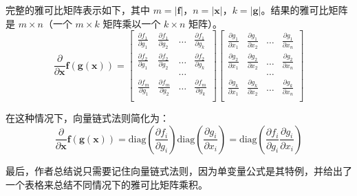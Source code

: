\documentclass[11pt]{article}
\begin{document}
完整的雅可比矩阵表示如下，其中 \(m=|\mathbf{f}|\)，\(n=|\mathbf{x}|\)，\(k=|\mathbf{g}|\)。结果的雅可比矩阵是 \(m \times n\)（一个 \(m \times k\) 矩阵乘以一个 \(k \times n\) 矩阵）。
\[
\frac{\partial}{\partial \mathbf{x}} \mathbf{f}(\mathbf{g}(\mathbf{x})) = \begin{bmatrix}
\frac{\partial f_1}{\partial g_1} & \frac{\partial f_1}{\partial g_2} & \ldots & \frac{\partial f_1}{\partial g_k}\\
\frac{\partial f_2}{\partial g_1} & \frac{\partial f_2}{\partial g_2} & \ldots & \frac{\partial f_2}{\partial g_k}\\
& &\ldots\\
\frac{\partial f_m}{\partial g_1} & \frac{\partial f_m}{\partial g_2} & \ldots & \frac{\partial f_m}{\partial g_k}\\
\end{bmatrix}
\begin{bmatrix}
\frac{\partial g_1}{\partial x_1} & \frac{\partial g_1}{\partial x_2} & \ldots & \frac{\partial g_1}{\partial x_n}\\
\frac{\partial g_2}{\partial x_1} & \frac{\partial g_2}{\partial x_2} & \ldots & \frac{\partial g_2}{\partial x_n}\\
& &\ldots\\
\frac{\partial g_k}{\partial x_1} & \frac{\partial g_k}{\partial x_2} & \ldots & \frac{\partial g_k}{\partial x_n}\\
\end{bmatrix}
\]

在这种情况下，向量链式法则简化为：
\[
\frac{\partial}{\partial \mathbf{x}} \mathbf{f}(\mathbf{g}(\mathbf{x})) = \text{diag}\left(\frac{\partial f_i}{\partial g_i}\right) \text{diag}\left(\frac{\partial g_i}{\partial x_i}\right) = \text{diag}\left(\frac{\partial f_i}{\partial g_i} \frac{\partial g_i}{\partial x_i}\right)
\]

最后，作者总结说只需要记住向量链式法则，因为单变量公式是其特例，并给出了一个表格来总结不同情况下的雅可比矩阵乘积。
\end{document}
